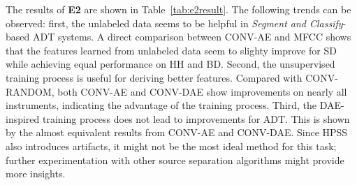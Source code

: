\documentclass{article}
\newcommand{\comment}[1]{{\textcolor{blue}{#1}}}
\begin{document}
\begin{table}[t]
\centering
{}
\caption{Significance check of the most improved pair from each paradigm.}
\label{tab:improvCheck}
\end{table}

The results of \textbf{E2} are shown in Table~\ref{tab:e2result}. The following trends can be observed: first, the unlabeled data seems to be helpful in \textit{Segment and Classify}-based ADT systems. A direct comparison between CONV-AE and MFCC shows that the features learned from unlabeled data seem to slighty improve for SD while achieving equal performance on HH and BD. Second, the unsupervised training process is useful for deriving better features. Compared with CONV-RANDOM, both CONV-AE and CONV-DAE show improvements on nearly all instruments, indicating the advantage of the training process. Third, the DAE-inspired training process does not lead to improvements for ADT. This is shown by the almost equivalent results from CONV-AE and CONV-DAE. Since HPSS also introduces artifacts, it might not be the most ideal method for this task;  further experimentation with other source separation algorithms might provide more insights. 
\end{document}
